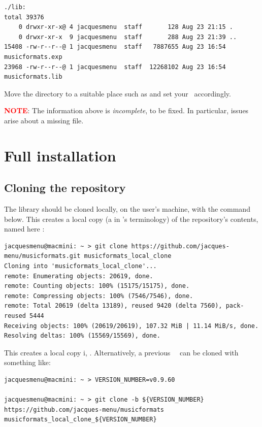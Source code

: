 \begin{lstlisting}[language=Terminal]
./lib:
total 39376
    0 drwxr-xr-x@ 4 jacquesmenu  staff       128 Aug 23 21:15 .
    0 drwxr-xr-x  9 jacquesmenu  staff       288 Aug 23 21:39 ..
15408 -rw-r--r--@ 1 jacquesmenu  staff   7887655 Aug 23 16:54 musicformats.exp
23968 -rw-r--r--@ 1 jacquesmenu  staff  12268102 Aug 23 16:54 musicformats.lib
\end{lstlisting}

Move the  directory to a suitable place such as  and set your  \environmentVariable\ accordingly.

\textcolor{red}{\bf NOTE}: The information above is {\it incomplete}, to be fixed. In particular, issues arise about a missing  file.


\chapter{Full installation}

\section{Cloning the repository}

The library should be cloned locally, on the user's machine, with the command below. This creates a local copy (a  in \git's terminology) of the repository's contents, named here :
\begin{lstlisting}[language=Terminal]
jacquesmenu@macmini: ~ > git clone https://github.com/jacques-menu/musicformats.git musicformats_local_clone
Cloning into 'musicformats_local_clone'...
remote: Enumerating objects: 20619, done.
remote: Counting objects: 100% (15175/15175), done.
remote: Compressing objects: 100% (7546/7546), done.
remote: Total 20619 (delta 13189), reused 9420 (delta 7560), pack-reused 5444
Receiving objects: 100% (20619/20619), 107.32 MiB | 11.14 MiB/s, done.
Resolving deltas: 100% (15569/15569), done.
\end{lstlisting}

This creates a local copy i, \masterBranch.
Alternatively, a previous \mf\ \version\ can be cloned with something like:
\begin{lstlisting}[language=Terminal]
jacquesmenu@macmini: ~ > VERSION_NUMBER=v0.9.60

jacquesmenu@macmini: ~ > git clone -b ${VERSION_NUMBER} https://github.com/jacques-menu/musicformats musicformats_local_clone_${VERSION_NUMBER}
\end{lstlisting}

